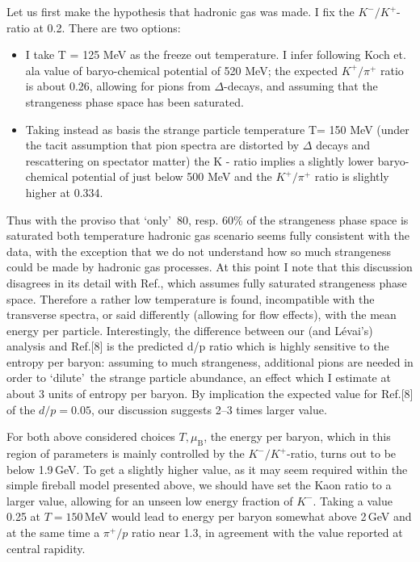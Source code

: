 \begin{mdframed}[linecolor=gray,roundcorner=12pt,backgroundcolor=Dandelion!15,linewidth=1pt,leftmargin=0cm,rightmargin=0cm,topline=true,bottomline=true,skipabove=12pt]
Let us first make the hypothesis that hadronic gas was made\footnotemark[27]. I fix the $K^-/K^+$-ratio at 0.2. There are two options: 
\begin{itemize} 
\item I take T = 125 MeV as the freeze out temperature. I infer following Koch et. al\footnotemark[23] a value of baryo-chemical potential of 520 MeV; the expected $K^+/\pi^+$ ratio is about 0.26, allowing for pions from $\Delta$-decays, and assuming that the strangeness phase space has been saturated. 
\item Taking instead as basis the strange particle temperature T= 150 MeV (under the tacit assumption that pion spectra are distorted by $\Delta$ decays and rescattering on spectator matter) the K - ratio implies a slightly lower baryo-chemical potential of just below 500 MeV and the $K^+/\pi^+$ ratio is slightly higher at 0.334. 
\end{itemize}
Thus with the proviso that \lq only\rq\ 80, resp. 60\% of the strangeness phase space is saturated both temperature hadronic gas scenario seems fully consistent with the data, with the exception that we do not understand how so much strangeness could be made by hadronic gas processes. At this point I note that this discussion disagrees in its detail with Ref.\footnotemark[8], which assumes fully saturated strangeness phase space. Therefore a rather low temperature is found, incompatible with the transverse spectra, or said differently (allowing for flow effects), with the mean energy per particle. Interestingly, the difference between our (and L\'evai\rq s\footnotemark[27]) analysis and Ref.[8] is the predicted d/p ratio which is highly sensitive to the entropy per baryon: assuming to much strangeness, additional pions are needed in order to `dilute\rq\ the strange particle abundance, an effect which I estimate at about 3 units of entropy per baryon. By implication the expected value for Ref.[8] of the $d/p = 0.05$, our discussion suggests 2--3 times larger value.  

For both above considered choices $T,\mu_\mathrm{B}$, the energy per baryon, which in this region of parameters is mainly controlled by the $K^-/K^+$-ratio, turns out to be below 1.9\,GeV. To get a slightly higher value, as it may seem required within the simple fireball model presented above, we should have set the Kaon ratio to a larger value, allowing for an unseen low energy fraction of $K^-$. Taking a value 0.25 at $T = 150$\,MeV would lead to energy per baryon somewhat above 2\,GeV and at the same time a $\pi^+/p$ ratio near 1.3, in agreement with the value reported at central rapidity. 


\end{mdframed}
